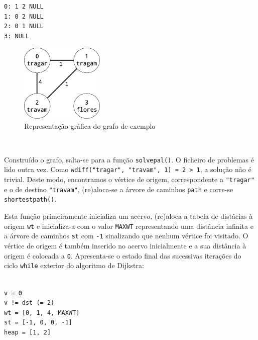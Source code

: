 \documentclass[a4paper, 18pt]{article}
\begin{document}
	\begin{minipage}{\linewidth}
		\centering
		\begin{minipage}{0.45\linewidth}
		\begin{center}
			\texttt{0: 1 \textrightarrow{} 2 \textrightarrow{} NULL \\
					1: 0 \textrightarrow{} 2 \textrightarrow{} NULL \\
					2: 0 \textrightarrow{} 1 \textrightarrow{} NULL \\
					3: NULL}
		\end{center}
		\end{minipage}
		\hspace{0.05\linewidth}
		\begin{minipage}{0.45\linewidth}
			\begin{figure}[H]
				\centering
				\includegraphics[width=4cm]{graph}
				\caption{Representação gráfica do grafo de exemplo}
			\end{figure}
		\end{minipage}
	\end{minipage} \\
	\par
	Construído o grafo, salta-se para a função \texttt{solve\textunderscore pal()}. O ficheiro de problemas é lido outra vez. Como \texttt{w\textunderscore diff("tragar", "travam", 1) = 2 > 1}, a solução não é trivial. Deste modo, encontramos o vértice de origem, correspondente a \texttt{"tragar"} e o de destino \texttt{"travam"}, (re)aloca-se a árvore de caminhos \texttt{path} e corre-se \texttt{shortest\textunderscore path()}.
	\par
	Esta função primeiramente inicializa um acervo, (re)aloca a tabela de distâcias à origem \texttt{wt} e inicializa-a com o valor \texttt{MAX\textunderscore WT} representando uma distância infinita e a árvore de caminhos \texttt{st} com \texttt{-1} sinalizando que nenhum vértice foi visitado. O vértice de origem é também inserido no acervo inicialmente e a sua distância à origem é colocada a \texttt{0}. Apresenta-se o estado final das sucessivas iterações do ciclo \texttt{while} exterior do algoritmo de Dijkstra:
	\begin{center}
		\begin{minipage}{0.45\linewidth}
		\texttt{\\
		v = 0\\
		v != dst (= 2) \\
		wt = [0, 1, 4, MAX\textunderscore WT] \\
		st = [-1, 0, 0, -1] \\
		heap = [1, 2] \\}
		\end{minipage}
	\end{center}
\end{document}
